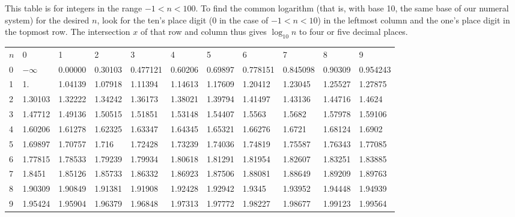 \documentclass[12pt]{article}
\begin{document}
This table is for integers in the range $-1 < n < 100$. To find the common logarithm (that is, with base 10, the same base of our numeral system) for the desired $n$, look for the ten's place digit (0 in the case of $-1 < n < 10$) in the leftmost column and the one's place digit in the topmost row. The intersection $x$ of that row and column thus gives $\log _{10} n$ to four or five decimal places.

\begin{tabular}{|l|l|l|l|l|l|l|l|l|l|l|}
$n$ & 0 & 1 & 2 & 3 & 4 & 5 & 6 & 7 & 8 & 9 \\
0 & $-\infty$ & 0.00000 & 0.30103 & 0.477121 & 0.60206 & 0.69897 & 0.778151 & 0.845098 & 0.90309 & 0.954243 \\
1 & 1. & 1.04139 & 1.07918 & 1.11394 & 1.14613 & 1.17609 & 1.20412 & 1.23045 & 1.25527 & 1.27875 \\
2 & 1.30103 & 1.32222 & 1.34242 & 1.36173 & 1.38021 & 1.39794 & 1.41497 & 1.43136 & 1.44716 & 1.4624 \\
3 & 1.47712 & 1.49136 & 1.50515 & 1.51851 & 1.53148 & 1.54407 & 1.5563 & 1.5682 & 1.57978 & 1.59106 \\
4 & 1.60206 & 1.61278 & 1.62325 & 1.63347 & 1.64345 & 1.65321 & 1.66276 & 1.6721 & 1.68124 & 1.6902 \\
5 & 1.69897 & 1.70757 & 1.716 & 1.72428 & 1.73239 & 1.74036 & 1.74819 & 1.75587 & 1.76343 & 1.77085 \\
6 & 1.77815 & 1.78533 & 1.79239 & 1.79934 & 1.80618 & 1.81291 & 1.81954 & 1.82607 & 1.83251 & 1.83885 \\
7 & 1.8451 & 1.85126 & 1.85733 & 1.86332 & 1.86923 & 1.87506 & 1.88081 & 1.88649 & 1.89209 & 1.89763 \\
8 & 1.90309 & 1.90849 & 1.91381 & 1.91908 & 1.92428 & 1.92942 & 1.9345 & 1.93952 & 1.94448 & 1.94939 \\
9 & 1.95424 & 1.95904 & 1.96379 & 1.96848 & 1.97313 & 1.97772 & 1.98227 & 1.98677 & 1.99123 & 1.99564 \\
\end{tabular}
\end{document}
